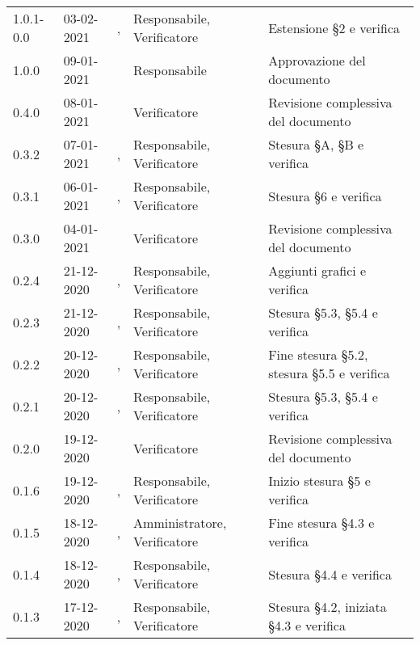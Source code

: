 {{\begin{longtable}{C{1.7cm} C{2.2cm} C{3.2cm} C{3cm} C{4.8cm}}
1.0.1-0.0 & 03-02-2021 & \PA{}, \SP{} & Responsabile, Verificatore & Estensione \S 2 e verifica\\

1.0.0 & 09-01-2021 & \SG{} & Responsabile & Approvazione del documento \\

0.4.0 & 08-01-2021 & \ZM{} & Verificatore & Revisione complessiva del documento \\

0.3.2 & 07-01-2021 & \BM{}, \ZM{} & Responsabile, Verificatore & Stesura \S A, \S B e verifica \\

0.3.1 & 06-01-2021 & \BM{}, \SH{} & Responsabile, Verificatore & Stesura \S 6 e verifica\\

0.3.0 & 04-01-2021 & \SH{} & Verificatore & Revisione complessiva del documento \\

0.2.4 & 21-12-2020 & \SG{}, \SH{} & Responsabile, Verificatore & Aggiunti grafici  e verifica\\

0.2.3 & 21-12-2020 & \BM{}, \ZM{} & Responsabile, Verificatore & Stesura \S 5.3, \S 5.4 e verifica\\

0.2.2 & 20-12-2020 & \SG{}, \ZM{} & Responsabile, Verificatore & Fine stesura \S 5.2, stesura \S 5.5  e verifica\\

0.2.1 & 20-12-2020 & \BM{}, \ZM{} & Responsabile, Verificatore & Stesura \S 5.3, \S 5.4 e verifica\\

0.2.0 & 19-12-2020 & \ZM{} & Verificatore & Revisione complessiva del documento \\

0.1.6 & 19-12-2020 & \SG{}, \SH{} & Responsabile, Verificatore & Inizio stesura \S 5 e verifica\\

0.1.5 & 18-12-2020 & \PA{}, \SH{} & Amministratore, Verificatore & Fine stesura \S 4.3 e verifica\\

0.1.4 & 18-12-2020 & \SG{}, \ZM{} & Responsabile, Verificatore & Stesura \S 4.4 e verifica \\

0.1.3 & 17-12-2020 & \BM{}, \ZM{} & Responsabile, Verificatore & Stesura \S 4.2, iniziata \S 4.3 e verifica \\


\end{longtable}}}
